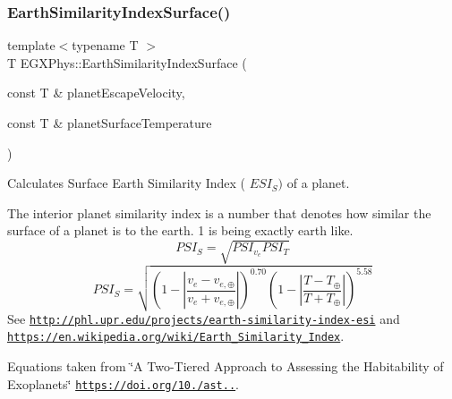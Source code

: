 \subsubsection{\texorpdfstring{Earth\+Similarity\+Index\+Surface()}{EarthSimilarityIndexSurface()}}
{\footnotesize\ttfamily template$<$typename T $>$ \\
T E\+G\+X\+Phys\+::\+Earth\+Similarity\+Index\+Surface (\begin{DoxyParamCaption}\item[{const T \&}]{planet\+Escape\+Velocity,  }\item[{const T \&}]{planet\+Surface\+Temperature }\end{DoxyParamCaption})}



Calculates Surface Earth Similarity Index ( $ESI_S)$ of a planet. 

The interior planet similarity index is a number that denotes how similar the surface of a planet is to the earth. 1 is being exactly earth like. \[PSI_S=\sqrt{PSI_{v_e} PSI_T}\] \[PSI_S=\sqrt{\left ( 1 - \left | \frac{v_e-v_{e,\oplus}}{v_e+v_{e,\oplus}} \right | \right )^{0.70} \left ( 1 - \left | \frac{T-T_{\oplus}}{T+T_{\oplus}} \right | \right )^{5.58}}\] See \href{http://phl.upr.edu/projects/earth-similarity-index-esi}{\tt http\+://phl.\+upr.\+edu/projects/earth-\/similarity-\/index-\/esi} and \href{https://en.wikipedia.org/wiki/Earth_Similarity_Index}{\tt https\+://en.\+wikipedia.\+org/wiki/\+Earth\+\_\+\+Similarity\+\_\+\+Index}.

Equations taken from \char`\"{}\+A Two-\/\+Tiered Approach to Assessing the Habitability of Exoplanets\char`\"{} \href{https://doi.org/10.1089/ast.2010.0592}{\tt https\+://doi.\+org/10./ast..}.


